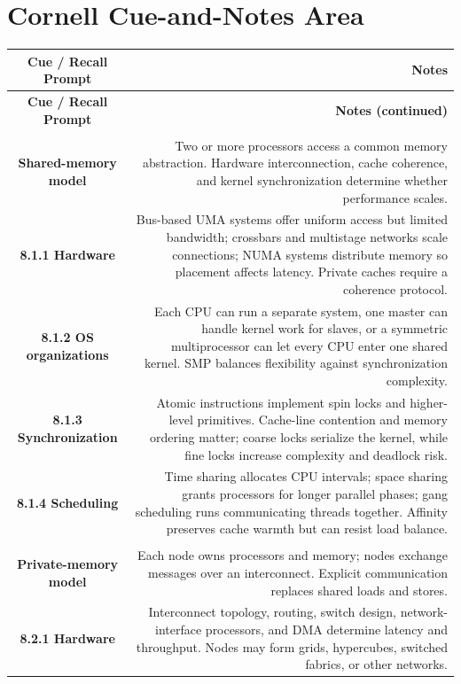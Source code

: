 \documentclass[10pt,letterpaper]{article}
\begin{document}
\section*{Cornell Cue-and-Notes Area}
\small
\begin{longtable}{C N}
\color{white}\textbf{Cue / Recall Prompt} &
\color{white}\textbf{Notes}\\
\endfirsthead
{}
\color{white}\textbf{Cue / Recall Prompt} &
\color{white}\textbf{Notes (continued)}\\
\endhead
{}\\*\hline
\textbf{Shared-memory model} & Two or more processors access a common memory abstraction. Hardware interconnection, cache coherence, and kernel synchronization determine whether performance scales.\\\hline
\textbf{8.1.1 Hardware} & Bus-based UMA systems offer uniform access but limited bandwidth; crossbars and multistage networks scale connections; NUMA systems distribute memory so placement affects latency. Private caches require a coherence protocol.\\\hline
\textbf{8.1.2 OS organizations} & Each CPU can run a separate system, one master can handle kernel work for slaves, or a symmetric multiprocessor can let every CPU enter one shared kernel. SMP balances flexibility against synchronization complexity.\\\hline
\textbf{8.1.3 Synchronization} & Atomic instructions implement spin locks and higher-level primitives. Cache-line contention and memory ordering matter; coarse locks serialize the kernel, while fine locks increase complexity and deadlock risk.\\\hline
\textbf{8.1.4 Scheduling} & Time sharing allocates CPU intervals; space sharing grants processors for longer parallel phases; gang scheduling runs communicating threads together. Affinity preserves cache warmth but can resist load balance.\\\hline
{}\\*\hline
\textbf{Private-memory model} & Each node owns processors and memory; nodes exchange messages over an interconnect. Explicit communication replaces shared loads and stores.\\\hline
\textbf{8.2.1 Hardware} & Interconnect topology, routing, switch design, network-interface processors, and DMA determine latency and throughput. Nodes may form grids, hypercubes, switched fabrics, or other networks.\\\hline

\end{longtable}
\end{document}
